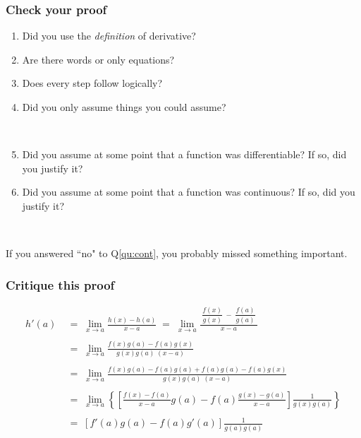 \documentclass[14pt]{beamer}
\newcommand{\setsize}[1]{\fontsize{#1}{#1}\selectfont} %
\newcommand{\smallerfont}{\setsize{13}} %
\begin{document}
\begin{frame}[t]
\frametitle{Check your proof}

\begin{enumerate}
	\item Did you use the \emph{definition} of derivative?
	\item  Are there words or only equations?
	\item  Does every step follow logically?
	\item  Did you only assume things you could assume?
	
	\
	
	\item  Did you assume at some point that a function was differentiable?  If so, did you justify it?

	\item \label{qu:cont} Did you assume at some point that a function was continuous?  If so, did you justify it?
	
\end{enumerate}

\

If you answered ``no" to Q\ref{qu:cont}, you probably missed something important.

\end{frame}
\begin{frame}[t]
\smallerfont
\frametitle{Critique this proof}
\vspace{-1cm}
	\begin{align*}
		h'(a) \; &= \;
			\lim_{x \to a} \frac{h(x) - h(a) }{x - a} \; = \; \lim_{x \to a} \frac{\; \dfrac{f(x)}{g(x)} \; - \; \dfrac{f(a)}{g(a)} \;}{x-a}
		\\ \ \\ & = \;
			\lim_{x \to a} \frac{f(x)g(a) - f(a)g(x)}{g(x)g(a) \; (x-a)}
			\\ \ \\& = \;
			\lim_{x \to a} \frac{f(x)g(a) - f(a)g(a) + f(a)g(a) - f(a) g(x)}{g(x) g(a) \; (x-a)}
			\\ \ \\ & = \;
			\lim_{x \to a} \left\{ \left[   \frac{f(x) - f(a)}{x-a} g(a) - f(a) \frac{g(x) - g(a)}{x-a} \right] \frac{1}{g(x) g(a)} \right\}
			\\ \ \\ & = \;
			\left[ f'(a) g(a) - f(a) g'(a) \right] \frac{1}{g(a) g(a)}
	\end{align*}
\end{frame}
\end{document}
